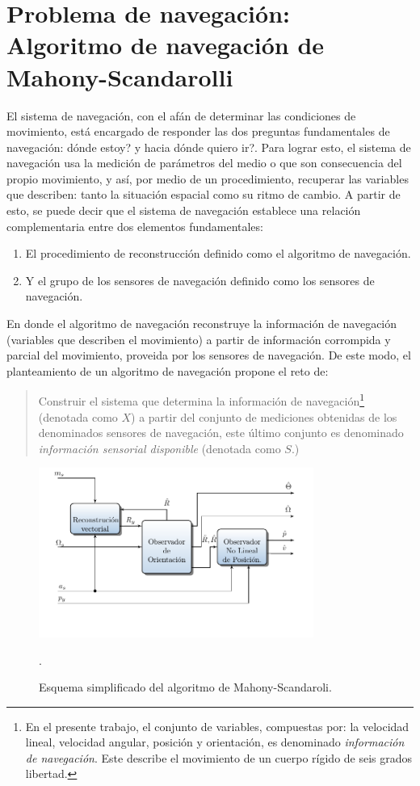 \documentclass[conference]{IEEEtran}
\begin{document}
\section{Problema de navegación: Algoritmo de navegación de Mahony-Scandarolli}
El sistema de navegación, con el afán de determinar las condiciones de movimiento, está encargado de responder las dos preguntas fundamentales de navegación: dónde estoy? y hacia dónde quiero ir?. Para lograr esto, el sistema de navegación usa la medición de parámetros del medio o que son consecuencia del propio movimiento, y así, por medio de un procedimiento, recuperar las variables que describen: tanto la situación espacial como su ritmo de cambio. A partir de esto, se puede decir que el sistema de navegación establece una relación complementaria entre dos elementos fundamentales:
\begin{enumerate}
\item El procedimiento de reconstrucción definido como el algoritmo de navegación.
\item Y el grupo de los sensores de navegación definido como los sensores de navegación.
\end{enumerate}
En donde el algoritmo de navegación reconstruye la información de navegación (variables que describen el movimiento) a partir de información corrompida y parcial del movimiento, proveida por los sensores de navegación. De este modo, el planteamiento de un algoritmo de navegación propone el reto de:
\begin{quote} Construir el sistema que determina la información de navegación\footnote{En el presente trabajo, el conjunto de variables, compuestas por: la velocidad lineal, velocidad angular, posición y orientación, es denominado \emph{información de navegación}. Este describe el movimiento de un cuerpo rígido de seis grados libertad.} (denotada como $X$) a partir del conjunto de mediciones obtenidas de los denominados sensores de navegación, este último conjunto es denominado \emph{información sensorial disponible} (denotada como $S$.)
\end{quote}
\begin{figure}
\begin{center}
\includegraphics[width=9cm,clip]{aam_fig7.pdf}
\caption{Esquema simplificado del algoritmo de Mahony-Scandaroli.}
\scriptsize{.}
\label{solucionMS_fig1}
\end{center}
\end{figure}
\end{document}
